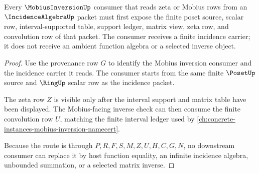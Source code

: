 \begin{theorem}
\label{thm:incidence-algebra-mobius-consumer-route}
Every $\MobiusInversionUp$ consumer that reads zeta or Mobius rows from an $\IncidenceAlgebraUp$ packet must first expose the finite poset source, scalar row, interval-supported table, support ledger, matrix view, zeta row, and convolution row of that packet. The consumer receives a finite incidence carrier; it does not receive an ambient function algebra or a selected inverse object.
\end{theorem}
\begin{proof}
Use the provenance row $G$ to identify the Mobius inversion consumer and the incidence carrier it reads. The consumer starts from the same finite $\PosetUp$ source and $\RingUp$ scalar row as the incidence packet.

The zeta row $Z$ is visible only after the interval support and matrix table have been displayed. The Mobius-facing inverse check can then consume the finite convolution row $U$, matching the finite interval ledger used by \autoref{ch:concrete-instances-mobius-inversion-namecert}.

Because the route is through $P,R,F,S,M,Z,U,H,C,G,N$, no downstream consumer can replace it by host function equality, an infinite incidence algebra, unbounded summation, or a selected matrix inverse.
\end{proof}




